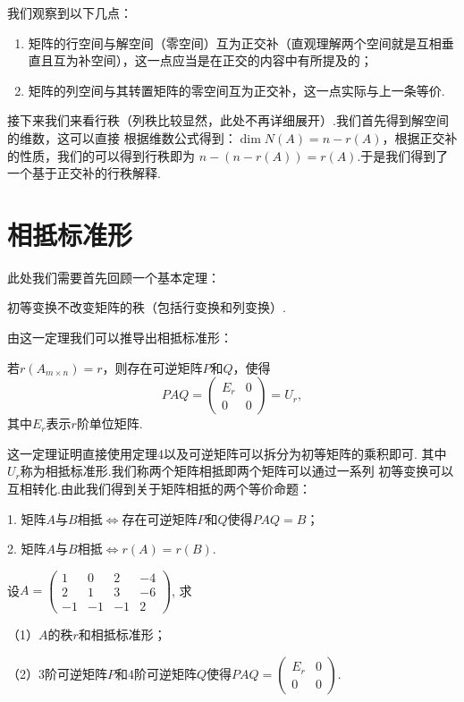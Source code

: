 我们观察到以下几点：
\begin{enumerate}
	\item 矩阵的行空间与解空间（零空间）互为正交补（直观理解两个空间就是互相垂直且互为补空间），这一点应当是在正交的内容中有所提及的；
	\item 矩阵的列空间与其转置矩阵的零空间互为正交补，这一点实际与上一条等价.
\end{enumerate}

接下来我们来看行秩（列秩比较显然，此处不再详细展开）.我们首先得到解空间的维数，这可以直接
根据维数公式得到：$\dim N(A)=n-r(A)$，根据正交补的性质，我们的可以得到行秩即为
$n-(n-r(A))=r(A)$.于是我们得到了一个基于正交补的行秩解释.

\section{相抵标准形}
此处我们需要首先回顾一个基本定理：
\begin{theorem}
	初等变换不改变矩阵的秩（包括行变换和列变换）.
\end{theorem}
由这一定理我们可以推导出相抵标准形：
\begin{theorem}
	若$r(A_{m \times n})=r$，则存在可逆矩阵$P$和$Q$，使得
	$$PAQ=\begin{pmatrix}
		E_r & 0 \\ 0 & 0
	\end{pmatrix}=U_r,$$
	其中$E_r$表示$r$阶单位矩阵.
\end{theorem}
这一定理证明直接使用定理4以及可逆矩阵可以拆分为初等矩阵的乘积即可.
其中$U_r$称为相抵标准形.我们称两个矩阵相抵即两个矩阵可以通过一系列
初等变换可以互相转化.由此我们得到关于矩阵相抵的两个等价命题：

1. 矩阵$A$与$B$相抵$\iff$存在可逆矩阵$P$和$Q$使得$PAQ=B$；

2. 矩阵$A$与$B$相抵$\iff r(A)=r(B)$.

\begin{example}
	设$A=\begin{pmatrix}
		1 & 0 & 2 & -4 \\ 2 & 1 & 3 & -6 \\ -1 & -1 & -1 & 2
	\end{pmatrix}$, 求

	\textup{（1）}$A$的秩$r$和相抵标准形；

	\textup{（2）}$3$阶可逆矩阵$P$和$4$阶可逆矩阵$Q$使得$PAQ=\begin{pmatrix}
		E_r & 0 \\ 0 & 0
	\end{pmatrix}$.
\end{example}


